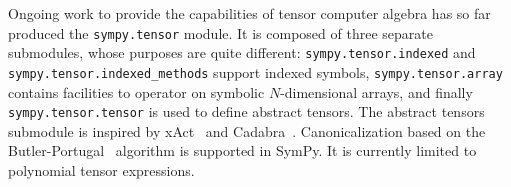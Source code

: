 Ongoing work to provide the capabilities of tensor computer algebra has so far
produced the \texttt{sympy.tensor} module.  It is composed of three separate
submodules, whose purposes are quite different: \texttt{sympy.\allowbreak{}tensor.\allowbreak{}indexed} and
\texttt{sympy.\allowbreak{}tensor.\allowbreak{}indexed\_methods} support indexed symbols,
\texttt{sympy.\allowbreak{}tensor.\allowbreak{}array} contains facilities to operator on symbolic $N$-dimensional
arrays, and finally \texttt{sympy.\allowbreak{}tensor.\allowbreak{}tensor} is used to define abstract tensors.
The abstract tensors submodule
is inspired by xAct~\cite{xAct} and Cadabra~\cite{Peeters2007cadabra}.
Canonicalization based on the Butler-Portugal~\cite{ManssurPortugal1999}
algorithm is supported in SymPy.  It is currently limited to polynomial tensor
expressions.
